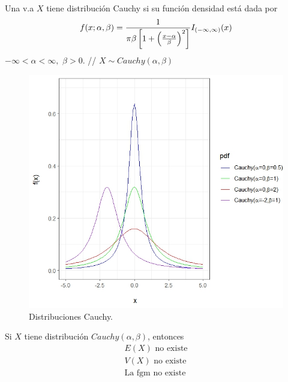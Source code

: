 \begin{i}
\begin{definition}
Una v.a $X$ tiene distribución Cauchy si su función densidad está dada por 
\begin{equation*}
f(x;\alpha ,\beta )=\frac{1}{\pi \beta \left[ 1+\left( \frac{x-\alpha }{%
\beta }\right) ^{2}\right] }I_{(-\infty ,\infty )}(x)
\end{equation*}
$-\infty <\alpha <\infty ,$ $\beta >0.$ // $X\sim Cauchy(\alpha ,\beta )$
\end{definition}


\begin{figure}[h!]
\centering
\includegraphics[scale=1]{Figuras/Cauchys.jpeg}
\caption{Distribuciones Cauchy.}
\end{figure}

\begin{theorem}
Si $X$ tiene distribución $Cauchy(\alpha ,\beta )$, entonces
\begin{equation*}
\begin{array}{l}
E(X)\text{ no existe} \\ 
V(X)\text{ no existe} \\ 
\text{La fgm no existe}
\end{array}
\end{equation*}
\end{theorem}


\end{i}
